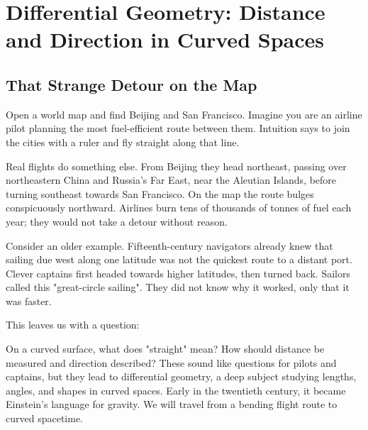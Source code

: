 \chapter{Differential Geometry: Distance and Direction in Curved Spaces}

\section{That Strange Detour on the Map}

Open a world map and find Beijing and San Francisco. Imagine you are an airline pilot planning the most fuel-efficient route between them. Intuition says to join the cities with a ruler and fly straight along that line.

Real flights do something else. From Beijing they head northeast, passing over northeastern China and Russia's Far East, near the Aleutian Islands, before turning southeast towards San Francisco. On the map the route bulges conspicuously northward. Airlines burn tens of thousands of tonnes of fuel each year; they would not take a detour without reason.

Consider an older example. Fifteenth-century navigators already knew that sailing due west along one latitude was not the quickest route to a distant port. Clever captains first headed towards higher latitudes, then turned back. Sailors called this "great-circle sailing". They did not know why it worked, only that it was faster.

This leaves us with a question:

\begin{center}
\end{center}

On a curved surface, what does "straight" mean? How should distance be measured and direction described? These sound like questions for pilots and captains, but they lead to differential geometry, a deep subject studying lengths, angles, and shapes in curved spaces. Early in the twentieth century, it became Einstein's language for gravity. We will travel from a bending flight route to curved spacetime.

